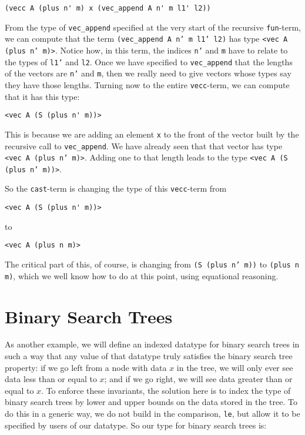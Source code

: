 \documentclass{book}[12pt]
\begin{document}
\begin{verbatim}
(vecc A (plus n' m) x (vec_append A n' m l1' l2)) 
\end{verbatim}

\noindent From the type of \texttt{vec\_append} specified at the very
start of the recursive \texttt{fun}-term, we can compute that the term
\texttt{(vec\_append A n' m l1' l2)} has type \texttt{<vec A (plus n'
m)>}.  Notice how, in this term, the indices \texttt{n'} and
\texttt{m} have to relate to the types of \texttt{l1'} and
\texttt{l2}.  Once we have specified to \texttt{vec\_append} that the
lengths of the vectors are \texttt{n'} and \texttt{m}, then we really
need to give vectors whose types say they have those lengths.  Turning
now to the entire \texttt{vecc}-term, we can compute that it has this
type:

\begin{verbatim}
<vec A (S (plus n' m))>
\end{verbatim}

\noindent This is because we are adding an element \texttt{x} to the
front of the vector built by the recursive call to
\texttt{vec\_append}.  We have already seen that that vector has type
\texttt{<vec A (plus n' m)>}.  Adding one to that length leads to the
type \texttt{<vec A (S (plus n' m))>}.

So the \texttt{cast}-term is changing the type of this \texttt{vecc}-term
from 

\begin{verbatim}
<vec A (S (plus n' m))>
\end{verbatim}

\noindent to

\begin{verbatim}
<vec A (plus n m)>
\end{verbatim}

\noindent The critical part of this, of course, is changing from
\texttt{(S (plus n' m))} to \texttt{(plus n m)}, which we well know
how to do at this point, using equational reasoning.

\section{Binary Search Trees}

As another example, we will define an indexed datatype for binary
search trees in such a way that any value of that datatype truly
satisfies the binary search tree property: if we go left from a node
with data $x$ in the tree, we will only ever see data less than or
equal to $x$; and if we go right, we will see data greater than or
equal to $x$.  To enforce these invariants, the solution here is to
index the type of binary search trees by lower and upper bounds on the
data stored in the tree.  To do this in a generic way, we do not build
in the comparison, \texttt{le}, but allow it to be specified by users
of our datatype.  So our type for binary search trees is:
\end{document}
